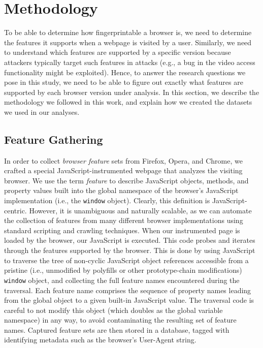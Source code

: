 \section{Methodology}
\label{sec:methodology}

To be able to determine how fingerprintable a browser is, we need to
determine the features it supports when a webpage is visited by a
user. Similarly, we need to understand which features are supported by
a specific version because attackers typically target such features in
attacks (e.g., a bug in the video access functionality might be
exploited). Hence, to answer the research questions we pose in this
study, we need to be able to figure out exactly what features are
supported by each browser version under analysis. In this section, we
describe the methodology we followed in this work, and explain how we
created the datasets we used in our analyses.

\subsection{Feature Gathering}
\label{sec:feature-gathering}

In order to collect \textit{browser feature} sets from Firefox, Opera, and
Chrome, we crafted a special JavaScript-instrumented webpage that analyzes the visiting browser. We use the term \textit{feature} to
describe JavaScript objects, methods, and property values built into the
global namespace of the browser's JavaScript implementation (i.e., the
\texttt{window} object).  Clearly, this definition is
JavaScript-centric. However, it is unambiguous and naturally scalable,
as we can automate the collection of features from many different
browser implementations using standard scripting and crawling
techniques. When our instrumented page is loaded by the browser, our
JavaScript is executed.  This code probes and iterates through the
features supported by the browser. This is done by using JavaScript to
traverse the tree of non-cyclic JavaScript object references accessible
from a pristine (i.e., unmodified by polyfills or other prototype-chain
modifications) \texttt{window} object, and collecting the full feature
names encountered during the traversal. Each feature name comprises the
sequence of property names leading from the global object to a given
built-in JavaScript value. The traversal code is careful to not modify
this object (which doubles as the global variable namespace) in any way,
to avoid contaminating the resulting set of feature names. Captured
feature sets are then stored in a database, tagged with identifying
metadata such as the browser's User-Agent string.

